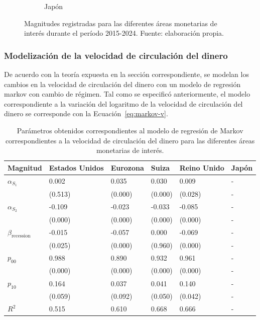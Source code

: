 \documentclass[titlepage, 12pt]{article}
\begin{document}
\begin{figure}
\begin{subfigure}[b]{0.49\textwidth}
        \caption{Japón}
    \end{subfigure}
    \caption{Magnitudes registradas para las diferentes áreas monetarias de interés durante el período 2015-2024. Fuente: elaboración propia.}
    \label{fig:magnitudes}
\end{figure}

\subsubsection{Modelización de la velocidad de circulación del dinero}

De acuerdo con la teoría expuesta en la sección correspondiente, se modelan los cambios en la velocidad de circulación del dinero con un modelo de regresión markov con cambio de régimen. Tal como se especificó anteriormente, el modelo correspondiente a la variación del logaritmo de la velocidad de circulación del dinero se corresponde con la Ecuación~\ref{eq:markov-v}.


\begin{table}
    \centering
    \singlespacing
    \begin{tabular}{llllll}
        \toprule
        Magnitud                     & Estados Unidos & Eurozona & Suiza   & Reino Unido & Japón \\
        \midrule
        $\alpha_{S_1}$               & 0.002          & 0.035    & 0.030   & 0.009       & -     \\
                                     & (0.513)        & (0.000)  & (0.000) & (0.028)     & -     \\
        $\alpha_{S_2}$               & -0.109         & -0.023   & -0.033  & -0.085      & -     \\
                                     & (0.000)        & (0.000)  & (0.000) & (0.000)     & -     \\
        $\beta_{\mathrm{recession}}$ & -0.015         & -0.057   & 0.000   & -0.069      & -     \\
                                     & (0.025)        & (0.000)  & (0.960) & (0.000)     & -     \\
        $p_{00}$                     & 0.988          & 0.890    & 0.932   & 0.961       & -     \\
                                     & (0.000)        & (0.000)  & (0.000) & (0.000)     & -     \\
        $p_{10}$                     & 0.164          & 0.037    & 0.041   & 0.140       & -     \\
                                     & (0.059)        & (0.092)  & (0.050) & (0.042)     & -     \\
        $R^2$                        & 0.515          & 0.610    & 0.668   & 0.666       & -     \\
        \bottomrule
    \end{tabular}
    \caption{Parámetros obtenidos correspondientes al modelo de regresión de Markov correspondientes a la velocidad de circulación del dinero para las diferentes áreas monetarias de interés.}
    \label{tab:v-markov-params}
\end{table}
\end{document}
